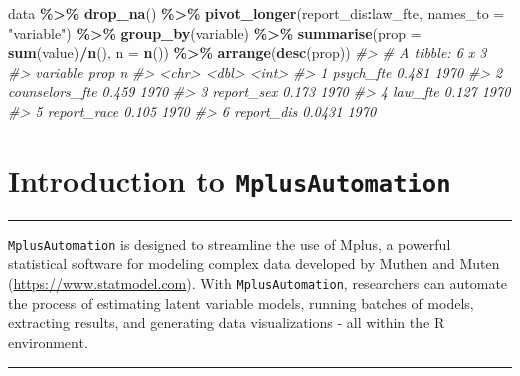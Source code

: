 \documentclass[
]{book}
\newenvironment{Shaded}{\begin{snugshade}}{\end{snugshade}}
\newcommand{\AttributeTok}[1]{\textcolor[rgb]{0.13,0.29,0.53}{#1}}
\newcommand{\CommentTok}[1]{\textcolor[rgb]{0.56,0.35,0.01}{\textit{#1}}}
\newcommand{\FunctionTok}[1]{\textcolor[rgb]{0.13,0.29,0.53}{\textbf{#1}}}
\newcommand{\NormalTok}[1]{#1}
\newcommand{\SpecialCharTok}[1]{\textcolor[rgb]{0.81,0.36,0.00}{\textbf{#1}}}
\newcommand{\StringTok}[1]{\textcolor[rgb]{0.31,0.60,0.02}{#1}}
\begin{document}
\begin{Shaded}
\begin{Highlighting}[]
\NormalTok{data }\SpecialCharTok{\%\textgreater{}\%} 
  \FunctionTok{drop\_na}\NormalTok{() }\SpecialCharTok{\%\textgreater{}\%} 
  \FunctionTok{pivot\_longer}\NormalTok{(report\_dis}\SpecialCharTok{:}\NormalTok{law\_fte, }\AttributeTok{names\_to =} \StringTok{"variable"}\NormalTok{) }\SpecialCharTok{\%\textgreater{}\%} 
  \FunctionTok{group\_by}\NormalTok{(variable) }\SpecialCharTok{\%\textgreater{}\%} 
  \FunctionTok{summarise}\NormalTok{(}\AttributeTok{prop =} \FunctionTok{sum}\NormalTok{(value)}\SpecialCharTok{/}\FunctionTok{n}\NormalTok{(),}
            \AttributeTok{n =} \FunctionTok{n}\NormalTok{()) }\SpecialCharTok{\%\textgreater{}\%}
  \FunctionTok{arrange}\NormalTok{(}\FunctionTok{desc}\NormalTok{(prop))}
\CommentTok{\#\textgreater{} \# A tibble: 6 x 3}
\CommentTok{\#\textgreater{}   variable         prop     n}
\CommentTok{\#\textgreater{}   \textless{}chr\textgreater{}           \textless{}dbl\textgreater{} \textless{}int\textgreater{}}
\CommentTok{\#\textgreater{} 1 psych\_fte      0.481   1970}
\CommentTok{\#\textgreater{} 2 counselors\_fte 0.459   1970}
\CommentTok{\#\textgreater{} 3 report\_sex     0.173   1970}
\CommentTok{\#\textgreater{} 4 law\_fte        0.127   1970}
\CommentTok{\#\textgreater{} 5 report\_race    0.105   1970}
\CommentTok{\#\textgreater{} 6 report\_dis     0.0431  1970}
\end{Highlighting}
\end{Shaded}

\chapter{\texorpdfstring{Introduction to \texttt{MplusAutomation}}{Introduction to MplusAutomation}}\label{introduction-to-mplusautomation}

\begin{center}\rule{0.5\linewidth}{0.5pt}\end{center}

\texttt{MplusAutomation}\citep{hallquist2018} is designed to streamline the use of Mplus, a powerful statistical software for modeling complex data developed by Muthen and Muten (\url{https://www.statmodel.com}). With \texttt{MplusAutomation}, researchers can automate the process of estimating latent variable models, running batches of models, extracting results, and generating data visualizations - all within the R environment.

\begin{center}\rule{0.5\linewidth}{0.5pt}\end{center}
\end{document}

